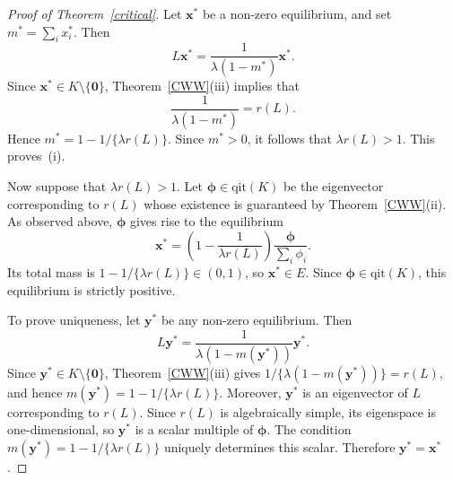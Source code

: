 \documentclass[12pt]{article}
\newcommand{\by}{\boldsymbol{y}}
\newcommand{\bphi}{\boldsymbol{\phi}}
\newcommand{\qit}{\text{qit}}
\newcommand{\bzero}{\boldsymbol{0}}
\newcommand{\bx}{\boldsymbol{x}}
\begin{document}
\begin{proof}[Proof of Theorem~\ref{critical}]
Let $\bx^*$ be a non-zero equilibrium, and set
$m^*=\sum_i x_i^*$. Then
$$
L\bx^*
=
\frac{1}{\lambda(1-m^*)}\bx^*.
$$
Since $\bx^*\in K\setminus\{\bzero\}$,
Theorem~\ref{CWW}(iii) implies that
$$
\frac{1}{\lambda(1-m^*)}=r(L).
$$
Hence $m^*=1-1/\{\lambda r(L)\}$. Since $m^*>0$, it follows that
$\lambda r(L)>1$. This proves~(i).

Now suppose that $\lambda r(L)>1$. Let
$\bphi\in\qit(K)$ be the eigenvector corresponding to $r(L)$ whose
existence is guaranteed by Theorem~\ref{CWW}(ii). As observed above,
$\bphi$ gives rise to the equilibrium
$$
\bx^*
=
\left(1-\frac{1}{\lambda r(L)}\right)
\frac{\bphi}{\sum_i\phi_i}.
$$
Its total mass is $1-1/\{\lambda r(L)\}\in(0,1)$, so
$\bx^*\in E$. Since $\bphi\in\qit(K)$, this equilibrium is strictly
positive.

To prove uniqueness, let $\by^*$ be any non-zero equilibrium. Then
$$
L\by^*
=
\frac{1}{\lambda(1-m(\by^*))}\by^*.
$$
Since $\by^*\in K\setminus\{\bzero\}$,
Theorem~\ref{CWW}(iii) gives
$1/\{\lambda(1-m(\by^*))\}=r(L)$, and hence
$m(\by^*)=1-1/\{\lambda r(L)\}$. Moreover, $\by^*$ is an eigenvector
of $L$ corresponding to $r(L)$. Since $r(L)$ is algebraically simple,
its eigenspace is one-dimensional, so $\by^*$ is a scalar multiple of
$\bphi$. The condition
$m(\by^*)=1-1/\{\lambda r(L)\}$ uniquely determines this scalar.
Therefore $\by^*=\bx^*$.
\end{proof}
\end{document}
